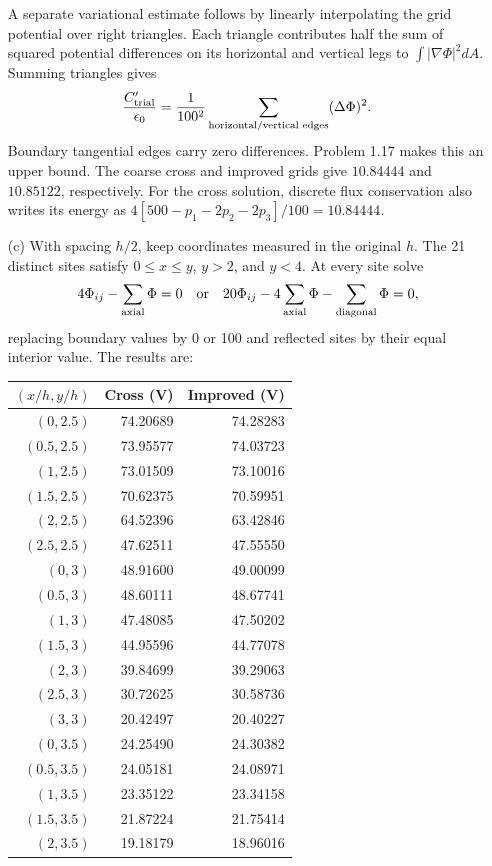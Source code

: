 \begin{enumerate}
A separate variational estimate follows by linearly interpolating the grid
potential over right triangles. Each triangle contributes half the sum of
squared potential differences on its horizontal and vertical legs to
$\int|\nabla\Phi|^2dA$. Summing triangles gives
\[
\frac{C'_{\rm trial}}{\epsilon_0}
=\frac1{100^2}\sum_{\text{horizontal/vertical edges}}(\Delta\Phi)^2.
\]
Boundary tangential edges carry zero differences. Problem 1.17 makes this
an upper bound. The coarse cross and improved grids give $10.84444$ and
$10.85122$, respectively. For the cross solution, discrete flux conservation
also writes its energy as
$4[500-p_1-2p_2-2p_3]/100=10.84444$.
\item[(c)] With spacing $h/2$, keep coordinates measured in the original
$h$. The 21 distinct sites satisfy $0\le x\le y$, $y>2$, and $y<4$.
At every site solve
\[
4\Phi_{ij}-\sum_{\rm axial}\Phi=0
\quad\hbox{or}\quad
20\Phi_{ij}-4\sum_{\rm axial}\Phi-\sum_{\rm diagonal}\Phi=0,
\]
replacing boundary values by 0 or 100 and reflected sites by their equal
interior value. The results are:
\begin{center}
\begin{tabular}{rrr}\toprule
$(x/h,y/h)$&Cross (V)&Improved (V)\\\midrule
$(0,2.5)$ & 74.20689 & 74.28283 \\
$(0.5,2.5)$ & 73.95577 & 74.03723 \\
$(1,2.5)$ & 73.01509 & 73.10016 \\
$(1.5,2.5)$ & 70.62375 & 70.59951 \\
$(2,2.5)$ & 64.52396 & 63.42846 \\
$(2.5,2.5)$ & 47.62511 & 47.55550 \\
$(0,3)$ & 48.91600 & 49.00099 \\
$(0.5,3)$ & 48.60111 & 48.67741 \\
$(1,3)$ & 47.48085 & 47.50202 \\
$(1.5,3)$ & 44.95596 & 44.77078 \\
$(2,3)$ & 39.84699 & 39.29063 \\
$(2.5,3)$ & 30.72625 & 30.58736 \\
$(3,3)$ & 20.42497 & 20.40227 \\
$(0,3.5)$ & 24.25490 & 24.30382 \\
$(0.5,3.5)$ & 24.05181 & 24.08971 \\
$(1,3.5)$ & 23.35122 & 23.34158 \\
$(1.5,3.5)$ & 21.87224 & 21.75414 \\
$(2,3.5)$ & 19.18179 & 18.96016 \\

\end{tabular}
\end{center}
\end{enumerate}
